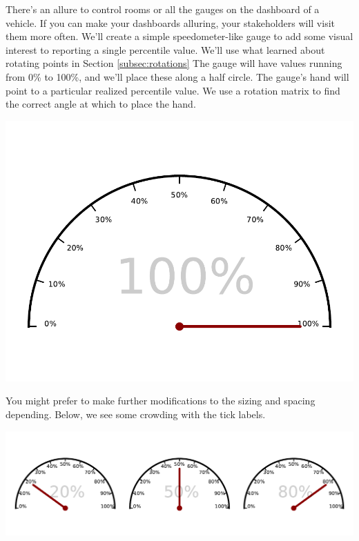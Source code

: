 There's an allure to control rooms or all the gauges on the dashboard of a vehicle. If you can make your dashboards alluring, your stakeholders will visit them more often. We'll create a simple speedometer-like gauge to add some visual interest to reporting a single percentile value. We'll use what learned about rotating points in Section \ref{subsec:rotations}
The gauge will have values running from 0\% to 100\%, and we'll place these along a half circle. The gauge's hand will point to a particular realized percentile value. We use a rotation matrix to find the correct angle at which to place the hand. 



\begin{center}
    \includegraphics[width = .75\textwidth]{figures/poetryplots/speedometer.pdf}
\end{center}

You might prefer to make further modifications to the sizing and spacing depending. Below, we see some crowding with the tick labels. 


\begin{center}
    \includegraphics[width = .75\textwidth]{figures/poetryplots/speedometers.pdf}
\end{center}